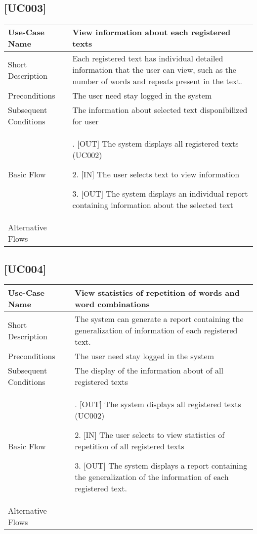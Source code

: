 \documentclass[11pt, twoside, a4paper]{book}
\begin{document}
			\subsection{[UC003]}			
				\begin{tabular}{|>{\centering\arraybackslash}m{3cm} |>{\arraybackslash}m{9cm}|}										   			   									   \hline
					Use-Case Name 			& [UC003] View information about each registered texts																								\\ \hline
					Short Description  		& Each registered text has individual detailed information that the user can view, such as the number of words and repeats present in the text.    	\\ \hline	
					Preconditions  			& The user need stay logged in the system      																										\\ \hline
					Subsequent Conditions	& The information about selected text disponibilized for user																						\\ \hline
					Basic Flow  			& 	1. [OUT] The system displays all registered texts	(UC002)													
											  
												2. [IN] The user selects text to view information														
											  
												3. [OUT] The system displays an individual report containing information about the selected text														\\ \hline
				Alternative Flows  		&       																																				\\ \hline
			\end{tabular}
			
			\subsection{[UC004]}			
				\begin{tabular}{|>{\centering\arraybackslash}m{3cm} |>{	\arraybackslash}m{9cm}|}										   			   \hline
					Use-Case Name 			& [UC004] View statistics of repetition of words and word combinations											\\ \hline
					Short Description  		& The system can generate a report containing the generalization of information of each registered text.    	\\ \hline	
					Preconditions  			& The user need stay logged in the system      																	\\ \hline
					Subsequent Conditions	& The display of the information about of all registered texts													\\ \hline
					Basic Flow  			& 	1. [OUT] The system displays all registered texts (UC002)   													
											  
												2. [IN] The user selects to view statistics of repetition of all registered texts											
											  
												3. [OUT] The system displays a report containing the generalization of the information of each registered text.	\\ \hline
				Alternative Flows  		&       																											\\ \hline
			\end{tabular}
\end{document}
